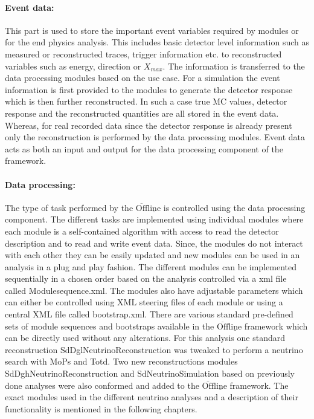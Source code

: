 \paragraph*{Event data:}
This part is used to store the important event variables required by modules or for the end physics analysis. This includes basic detector level information such as measured or reconstructed traces, trigger information etc. to reconstructed variables such as energy, direction or $X_{max}$. The information is transferred to the data processing modules based on the use case. For a simulation the event information is first provided to the modules to generate the detector response which is then further reconstructed. In such a case true MC values, detector response and the reconstructed quantities are all stored in the event data. Whereas, for real recorded data since the detector response is already present only the reconstruction is performed by the data processing modules. Event data acts as both an input and output for the data processing component of the framework.

\paragraph*{Data processing:}
The type of task performed by the $\mathrm{\overline{Off}\underline{line}}$ is controlled using the data processing component. The different tasks are implemented using individual modules where each module is a self-contained algorithm with access to read the detector description and to read and write event data. Since, the modules do not interact with each other they can be easily updated and new modules can be used in an analysis in a plug and play fashion. The different modules can be implemented sequentially in a chosen order based on the analysis controlled via a xml file called Modulesequence.xml. The modules also have adjustable parameters which can either be controlled using XML steering files of each module or using a central XML file called bootstrap.xml. There are various standard pre-defined sets of module sequences and bootstraps available in the $\mathrm{\overline{Off}\underline{line}}$ framework which can be directly used without any alterations. For this analysis one standard reconstruction SdDglNeutrinoReconstruction was tweaked to perform a neutrino search with MoPs and Totd. Two new reconstructions modules SdDghNeutrinoReconstruction and SdNeutrinoSimulation based on previously done analyses were also conformed and added to the $\mathrm{\overline{Off}\underline{line}}$ framework. The exact modules used in the different neutrino analyses and a description of their functionality is mentioned in the following chapters.

